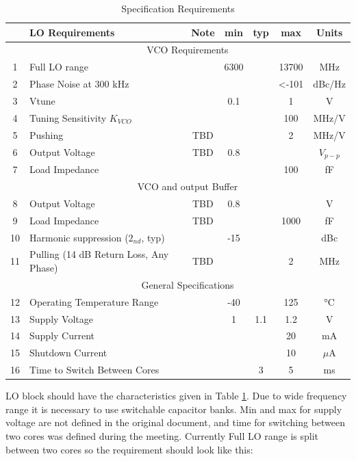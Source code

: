 \begin{table}[ht]
	\centering
	\begin{tabular}{|c|l|c|c|c|c|c|}
		\hline
		& LO Requirements & Note & min & typ & max & Units \\
		\hline
		& \multicolumn{6}{|c|}{VCO Requirements} \\
		\hline
		1 & Full LO range &  & 6300  &  & 13700 & MHz \\ 
		\hline
		2 & Phase Noise at 300 kHz &  &  &  & <-101 & dBc/Hz \\ 
		\hline
		3 & Vtune &  & 0.1 &  & 1 & V  \\ 
		\hline
		4 & Tuning Sensitivity $K_{VCO}$ &  &  &  & 100 & MHz/V  \\ 
		\hline
		5 & Pushing & TBD &  &  & 2 & MHz/V  \\ 
		\hline
		6 & Output Voltage & TBD & 0.8 &  & & $V_{p-p}$  \\ 
		\hline
		7 & Load Impedance &  &  &  & 100 & fF  \\ 
		\hline
		& \multicolumn{6}{|c|}{VCO and output Buffer} \\
		\hline
		8 & Output Voltage & TBD & 0.8  &  &  & V  \\ 
		\hline
		9 & Load Impedance & TBD &  &  & 1000 & fF  \\ 
		\hline
		10 & Harmonic suppression ($2_{nd}$, typ) &  & -15 &  &  & dBc  \\ 
		\hline
		11 & Pulling (14 dB Return Loss, Any Phase) & TBD &  &  & 2 & MHz  \\ 
		\hline
		& \multicolumn{6}{|c|}{General Specifications} \\
		\hline
		12 & Operating Temperature Range &  & -40 &  & 125 & °C  \\ 
		\hline
		13 & Supply Voltage &  & 1 & 1.1 & 1.2 & V  \\ 
		\hline
		14 & Supply Current &  &  &  & 20 & mA  \\ 
		\hline
		15 & Shutdown Current &  &  &  & 10 & $\mu$A  \\ 
		\hline
		16 & Time to Switch Between Cores  &  &  & 3 & 5 & ms  \\ 
		\hline
	\end{tabular}
	\label{table-spec}
	\caption{Specification Requirements} 

\end{table}

LO block should have the characteristics given in Table \ref{table-spec}. Due to wide frequency range it is necessary to use switchable capacitor banks. Min and max for supply voltage are not defined in the original document, and time for switching between two cores was defined during the meeting. Currently Full LO range is split between two cores so the requirement should look like this:

